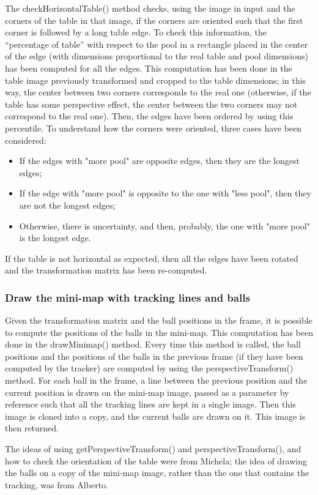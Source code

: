The checkHorizontalTable() method checks, using the image in input and the corners of the table in that image, if the corners are oriented such that the first corner is followed by a long table edge. To check this information, the “percentage of table” with respect to the pool in a rectangle placed in the center of the edge (with dimensions proportional to the real table and pool dimensions) has been computed for all the edges. This computation has been done in the table image previously transformed and cropped to the table dimensions; in this way, the center between two corners corresponds to the real one (otherwise, if the table has some perspective effect, the center between the two corners may not correspond to the real one). Then, the edges have been ordered by using this percentile. To understand how the corners were oriented, three cases have been considered:
\begin{itemize}
	\item If the edges with "more pool" are opposite edges, then they are the longest edges;
	\item If the edge with "more pool" is opposite to the one with "less pool", then they are not the longest edges;
	\item Otherwise, there is uncertainty, and then, probably, the one with "more pool" is the longest edge.
\end{itemize}
If the table is not horizontal as expected, then all the edges have been rotated and the transformation matrix has been re-computed.

\subsubsection{Draw the mini-map with tracking lines and balls}

Given the transformation matrix and the ball positions in the frame, it is possible to compute the positions of the balls in the mini-map. This computation has been done in the drawMinimap() method. Every time this method is called, the ball positions and the positions of the balls in the previous frame (if they have been computed by the tracker) are computed by using the perspectiveTransform() method. For each ball in the frame, a line between the previous position and the current position is drawn on the mini-map image, passed as a parameter by reference such that all the tracking lines are kept in a single image. Then this image is cloned into a copy, and the current balls are drawn on it. This image is then returned.\

The ideas of using getPerspectiveTransform() and perspectiveTransform(), and how to check the orientation of the table were from Michela; the idea of drawing the balls on a copy of the mini-map image, rather than the one that contains the tracking, was from Alberto.
